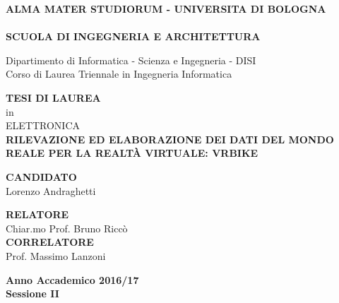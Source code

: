 \setlength{\textwidth}{450pt}
\vspace*{-2.5cm}
\begin{center}
  \textbf{ALMA MATER STUDIORUM - UNIVERSITA DI BOLOGNA}\\
  \vspace*{-.38cm}
  \hrulefill\\
  
  \textbf{SCUOLA DI INGEGNERIA  E ARCHITETTURA}\\
  \vspace*{.75cm}
  
  
  Dipartimento di Informatica - Scienza e Ingegneria - DISI\\
  Corso di Laurea Triennale in Ingegneria Informatica\\
  
  \vspace*{1.2cm}
  
  
  \textbf{TESI DI LAUREA}\\
  \vspace*{.4cm}
  in\\
  \vspace*{.4cm}
  ELETTRONICA\\

  \vspace*{3.2cm} \Large
  \textbf{RILEVAZIONE ED ELABORAZIONE DEI DATI DEL MONDO REALE PER LA REALTÀ VIRTUALE: VRBIKE}\\
 \end{center}
 
 \vspace*{3cm}
 
 \begin{flushleft}
  \textbf{CANDIDATO}\\ Lorenzo Andraghetti \\
\end{flushleft}

\vspace*{-2cm}

 \begin{flushright}
  \textbf{RELATORE}\\ Chiar.mo Prof. Bruno Riccò \\
  \vspace*{0.8cm}
  \textbf{CORRELATORE}\\ Prof. Massimo Lanzoni
 \end{flushright}

   
\vspace*{1.5cm}

\begin{center}
	\textbf{
  Anno Accademico 2016/17\\
  Sessione II
  }
\end{center}
\setlength{\textwidth}{380pt}